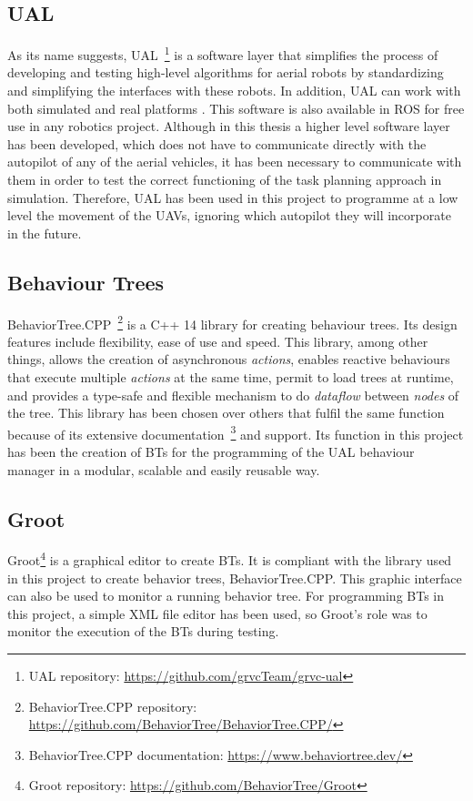 \subsection{UAL}
\label{subsec:UAL}
As its name suggests, \gls{UAL}~\footnote{UAL repository: \url{https://github.com/grvcTeam/grvc-ual}} is a software layer that simplifies the process of developing and testing high-level algorithms for aerial robots by standardizing and simplifying the interfaces with these robots. In addition, \gls{UAL} can work with both simulated and real platforms \cite{real_ijars20}. This software is also available in \gls{ROS} for free use in any robotics project. Although in this thesis a higher level software layer has been developed, which does not have to communicate directly with the autopilot of any of the aerial vehicles, it has been necessary to communicate with them in order to test the correct functioning of the task planning approach in simulation. Therefore, \gls{UAL} has been used in this project to programme at a low level the movement of the \glspl{UAV}, ignoring which autopilot they will incorporate in the future.

\subsection{Behaviour Trees}
\label{subsec:BehaviourTrees}
BehaviorTree.CPP~\footnote{BehaviorTree.CPP repository: \url{https://github.com/BehaviorTree/BehaviorTree.CPP/}} is a C++ 14 library for creating behaviour trees. Its design features include flexibility, ease of use and speed. This library, among other things, allows the creation of asynchronous \emph{actions}, enables reactive behaviours that execute multiple \emph{actions} at the same time, permit to load trees at runtime, and provides a type-safe and flexible mechanism to do \emph{dataflow} between \emph{nodes} of the tree. This library has been chosen over others that fulfil the same function because of its extensive documentation~\footnote{BehaviorTree.CPP documentation: \url{https://www.behaviortree.dev/}} and support. Its function in this project has been the creation of \glspl{BT} for the programming of the \gls{UAL} behaviour manager in a modular, scalable and easily reusable way.

\subsection{Groot}
\label{subsec:Groot}
Groot\footnote{Groot repository: \url{https://github.com/BehaviorTree/Groot}} is a graphical editor to create \glspl{BT}. It is compliant with the library used in this project to create behavior trees, BehaviorTree.CPP. This graphic interface can also be used to monitor a running behavior tree. For programming \glspl{BT} in this project, a simple XML file editor has been used, so Groot's role was to monitor the execution of the \glspl{BT} during testing.

